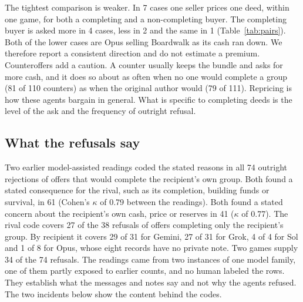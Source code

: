 The tightest comparison is weaker. In 7 cases one seller prices one deed, within one game, for both a completing and a non-completing buyer. The completing buyer is asked more in 4 cases, less in 2 and the same in 1 (Table~\ref{tab:pairs}). Both of the lower cases are Opus selling Boardwalk as its cash ran down. We therefore report a consistent direction and do not estimate a premium. Counteroffers add a caution. A counter usually keeps the bundle and asks for more cash, and it does so about as often when no one would complete a group (81 of 110 counters) as when the original author would (79 of 111). Repricing is how these agents bargain in general. What is specific to completing deeds is the level of the ask and the frequency of outright refusal.

\subsection{What the refusals say}

Two earlier model-assisted readings coded the stated reasons in all 74 outright rejections of offers that would complete the recipient's own group. Both found a stated consequence for the rival, such as its completion, building funds or survival, in 61 (Cohen's $\kappa$ of 0.79 between the readings). Both found a stated concern about the recipient's own cash, price or reserves in 41 ($\kappa$ of 0.77). The rival code covers 27 of the 38 refusals of offers completing only the recipient's group. By recipient it covers 29 of 31 for Gemini, 27 of 31 for Grok, 4 of 4 for Sol and 1 of 8 for Opus, whose eight records have no private note. Two games supply 34 of the 74 refusals. The readings came from two instances of one model family, one of them partly exposed to earlier counts, and no human labeled the rows. They establish what the messages and notes say and not why the agents refused. The two incidents below show the content behind the codes.


